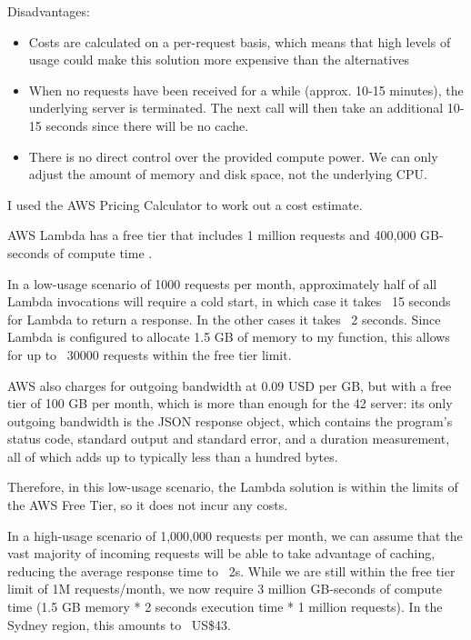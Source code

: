 Disadvantages:

\begin{itemize}
\item Costs are calculated on a per-request basis, which means that high levels of usage could make this solution more expensive than the alternatives
\item When no requests have been received for a while (approx. 10-15 minutes), the underlying server is terminated. The next call will then take an additional 10-15 seconds since there will be no cache.
\item There is no direct control over the provided compute power. We can only adjust the amount of memory and disk space, not the underlying CPU.
\end{itemize}

I used the AWS Pricing Calculator \cite{amazon-web-services-inc-2022C} to work out a cost estimate.

AWS Lambda has a free tier that includes 1 million requests and 400,000 GB-seconds of compute time \cite{amazon-web-services-inc-2022A}.

In a low-usage scenario of 1000 requests per month, approximately half of all Lambda invocations will require a cold start, in which case it takes ~15 seconds for Lambda to return a response. In the other cases it takes ~2 seconds. Since Lambda is configured to allocate 1.5 GB of memory to my function, this allows for up to ~30000 requests within the free tier limit.

AWS also charges for outgoing bandwidth at 0.09 USD per GB, but with a free tier of 100 GB per month, which is more than enough for the 42 server: its only outgoing bandwidth is the JSON response object, which contains the program's status code, standard output and standard error, and a duration measurement, all of which adds up to typically less than a hundred bytes.

Therefore, in this low-usage scenario, the Lambda solution is within the limits of the AWS Free Tier, so it does not incur any costs.

In a high-usage scenario of 1,000,000 requests per month, we can assume that the vast majority of incoming requests will be able to take advantage of caching, reducing the average response time to ~2s. While we are still within the free tier limit of 1M requests/month, we now require 3 million GB-seconds of compute time (1.5 GB memory * 2 seconds execution time * 1 million requests). In the Sydney region, this amounts to ~US\$43.


